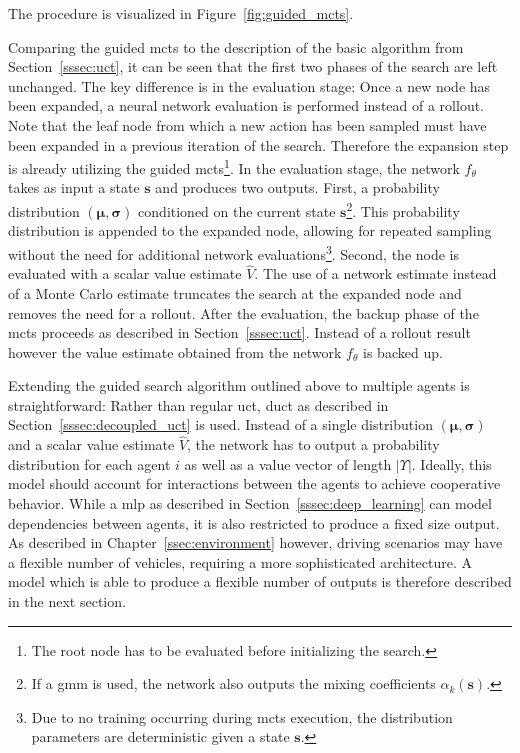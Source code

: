 The procedure is visualized in Figure~\ref{fig:guided_mcts}.

Comparing the guided \gls{mcts} to the description of the basic algorithm from Section~\ref{sssec:uct}, it can be seen that the first two phases of the search are left unchanged. The key difference is in the evaluation stage: Once a new node has been expanded, a neural network evaluation is performed instead of a rollout. Note that the leaf node from which a new action has been sampled must have been expanded in a previous iteration of the search. Therefore the expansion step is already utilizing the guided \gls{mcts}\footnote{The root node has to be evaluated before initializing the search.}. In the evaluation stage, the network $f_\theta$ takes as input a state $\mathbf s$ and produces two outputs. First, a probability distribution $(\bm \mu, \bm \sigma)$ conditioned on the current state $\mathbf s$\footnote{If a \gls{gmm} is used, the network also outputs the mixing coefficients $\alpha_k (\mathbf s)$.}. This probability distribution is appended to the expanded node, allowing for repeated sampling without the need for additional network evaluations\footnote{Due to no training occurring during \gls{mcts} execution, the distribution parameters are deterministic given a state $\mathbf s$.}. Second, the node is evaluated with a scalar value estimate $\hat V$. The use of a network estimate instead of a Monte Carlo estimate truncates the search at the expanded node and removes the need for a rollout. After the evaluation, the backup phase of the \gls{mcts} proceeds as described in Section~\ref{sssec:uct}. Instead of a rollout result however the value estimate obtained from the network $f_\theta$ is backed up.

Extending the guided search algorithm outlined above to multiple agents is straightforward: Rather than regular \gls{uct}, \gls{duct} as described in Section~\ref{sssec:decoupled_uct} is used. Instead of a single distribution $(\bm \mu, \bm \sigma)$ and a scalar value estimate $\hat V$, the network has to output a probability distribution for each agent $i$ as well as a value vector of length $|\Upsilon|$. Ideally, this model should account for interactions between the agents to achieve cooperative behavior. While a \gls{mlp} as described in Section~\ref{sssec:deep_learning} can model dependencies between agents, it is also restricted to produce a fixed size output. As described in Chapter~\ref{ssec:environment} however, driving scenarios may have a flexible number of vehicles, requiring a more sophisticated architecture. A model which is able to produce a flexible number of outputs is therefore described in the next section.

